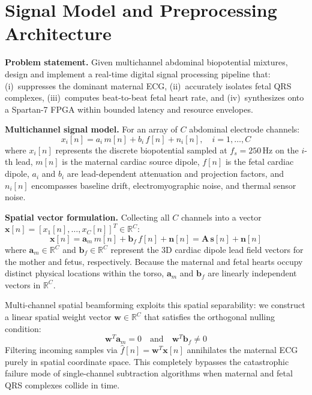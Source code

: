 \documentclass[10pt,twocolumn,letterpaper]{article}
\newcommand{\newcontent}[1]{\textcolor{midtermblue}{#1}}
\begin{document}
\section{Signal Model and Preprocessing Architecture}
\label{sec:problem}

\noindent\textbf{Problem statement.} Given multichannel abdominal biopotential mixtures, design and implement a real-time digital signal processing pipeline that: (i)~suppresses the dominant maternal ECG, (ii)~accurately isolates fetal QRS complexes, (iii)~computes beat-to-beat fetal heart rate, and (iv)~synthesizes onto a Spartan-7 FPGA within bounded latency and resource envelopes.

\noindent\textbf{Multichannel signal model.} For an array of $C$ abdominal electrode channels:
\begin{equation}
    x_i[n] = a_i\,m[n] + b_i\,f[n] + n_i[n], \quad i = 1,\ldots,C
    \label{eq:multichannel}
\end{equation}
where $x_i[n]$ represents the discrete biopotential sampled at $f_s = 250\,$Hz on the $i$-th lead, $m[n]$ is the maternal cardiac source dipole, $f[n]$ is the fetal cardiac dipole, $a_i$ and $b_i$ are lead-dependent attenuation and projection factors, and $n_i[n]$ encompasses baseline drift, electromyographic noise, and thermal sensor noise.

\newcontent{\noindent\textbf{Spatial vector formulation.} Collecting all $C$ channels into a vector $\mathbf{x}[n] = [x_1[n], \dots, x_C[n]]^T \in \mathbb{R}^C$:
\begin{equation}
    \mathbf{x}[n] = \mathbf{a}_m\,m[n] + \mathbf{b}_f\,f[n] + \mathbf{n}[n] = \mathbf{A}\,\mathbf{s}[n] + \mathbf{n}[n]
\end{equation}
where $\mathbf{a}_m \in \mathbb{R}^C$ and $\mathbf{b}_f \in \mathbb{R}^C$ represent the 3D cardiac dipole lead field vectors for the mother and fetus, respectively. Because the maternal and fetal hearts occupy distinct physical locations within the torso, $\mathbf{a}_m$ and $\mathbf{b}_f$ are linearly independent vectors in $\mathbb{R}^C$. 

Multi-channel spatial beamforming exploits this spatial separability: we construct a linear spatial weight vector $\mathbf{w} \in \mathbb{R}^C$ that satisfies the orthogonal nulling condition:
\begin{equation}
    \mathbf{w}^T \mathbf{a}_m = 0 \quad \text{and} \quad \mathbf{w}^T \mathbf{b}_f \neq 0
\end{equation}
Filtering incoming samples via $\hat{f}[n] = \mathbf{w}^T \mathbf{x}[n]$ annihilates the maternal ECG purely in spatial coordinate space. This completely bypasses the catastrophic failure mode of single-channel subtraction algorithms when maternal and fetal QRS complexes collide in time.}
\end{document}
